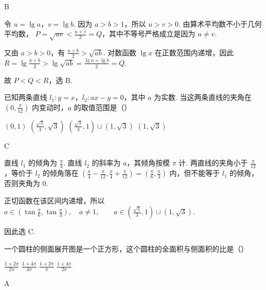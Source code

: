 \begin{answer}
B
\end{answer}

\begin{solution}
令 \(u=\lg a\)，\(v=\lg b\). 因为 \(a>b>1\)，所以 \(u>v>0\). 由算术平均数不小于几何平均数，
\(
P=\sqrt{uv}<\frac{u+v}{2}=Q
\)，其中不等号严格成立是因为 \(u\ne v\).

又由 \(a>b>0\)，有
\(
\frac{a+b}{2}>\sqrt{ab}
\).
对数函数 \(\lg x\) 在正数范围内递增，因此
\(
R=\lg\frac{a+b}{2}>\lg\sqrt{ab}=\frac{\lg a+\lg b}{2}=Q
\).

故 \(P<Q<R\)，选 B.
\end{solution}

\begin{problem}
已知两条直线 \(l_{1}: y = x\)，\(l_{2}: ax - y = 0\)，其中 \(a\) 为实数. 当这两条直线的夹角在 \(\left(0, \frac{\pi}{12}\right)\) 内变动时，\(a\) 的取值范围是（\quad）

\choices
    {\((0,1)\)}
    {\(\left(\frac{\sqrt{3}}{3},\sqrt{3}\right)\)}
    {\(\left(\frac{\sqrt{3}}{3}, 1\right) \cup (1, \sqrt{3})\)}
    {\((1, \sqrt{3})\)}
\end{problem}

\begin{answer}
C
\end{answer}

\begin{solution}
直线 \(l_{1}\) 的倾角为 \(\frac{\pi}{4}\). 直线 \(l_{2}\) 的斜率为 \(a\)，其倾角按模 \(\pi\) 计. 两直线的夹角小于 \(\frac{\pi}{12}\)，等价于 \(l_{2}\) 的倾角落在
\(
\left(\frac{\pi}{4}-\frac{\pi}{12},\frac{\pi}{4}+\frac{\pi}{12}\right)=\left(\frac{\pi}{6},\frac{\pi}{3}\right)
\)
内，但不能等于 \(l_{1}\) 的倾角，否则夹角为 \(0\).

正切函数在该区间内递增，所以
\(
a\in\left(\tan\frac{\pi}{6},\tan\frac{\pi}{3}\right),\quad a\ne1,\qquad a\in\left(\frac{\sqrt{3}}{3},1\right)\cup(1,\sqrt{3})
\).

因此选 C.
\end{solution}

\begin{problem}
一个圆柱的侧面展开图是一个正方形，这个圆柱的全面积与侧面积的比是（\quad）

\choices
    {\(\frac{1 + 2\pi}{2\pi}\)}
    {\(\frac{1 + 4\pi}{4\pi}\)}
    {\(\frac{1 + 2\pi}{\pi}\)}
    {\(\frac{1 + 4\pi}{2\pi}\)}
\end{problem}

\begin{answer}
A
\end{answer}


